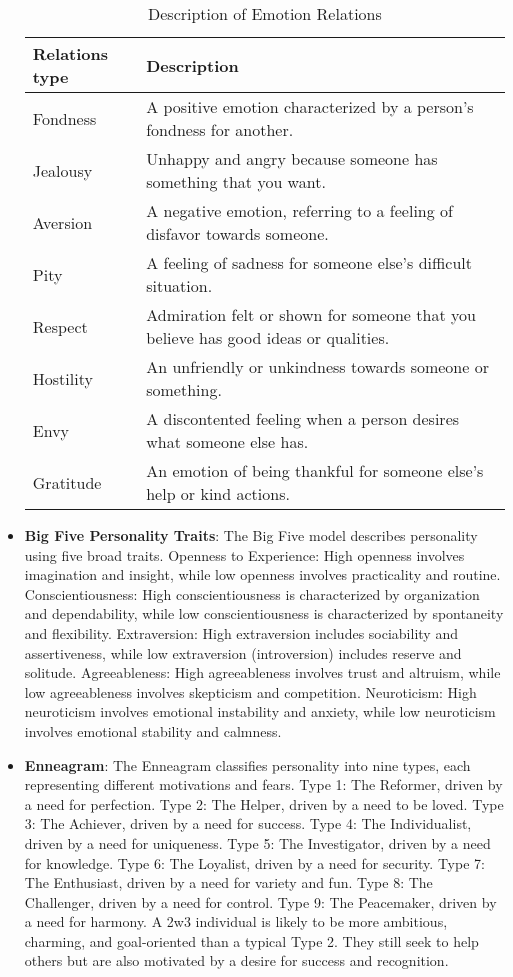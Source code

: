 \begin{itemize}
    \begin{table*}[ht]
      \small
      \centering
      \begin{tabular}{ll}
        \hline
        \textbf{Relations type} & \textbf{Description}\\
        \hline
        Fondness & A positive emotion characterized by a person's fondness for another.\\
        \hline
        Jealousy & Unhappy and angry because someone has something that you want.\\
        \hline
        Aversion  & A negative emotion, referring to a feeling of disfavor towards someone.\\
        \hline
        Pity  & A feeling of sadness for someone else's difficult situation.\\ 
        \hline
        Respect & Admiration felt or shown for someone that you believe has good ideas or qualities.\\
        \hline
        Hostility  & An unfriendly or unkindness towards someone or something.\\
        \hline
        Envy & A discontented feeling when a person desires what someone else has.\\
        \hline
        Gratitude & An emotion of being thankful for someone else's help or kind actions.\\
        \hline
      \end{tabular}
      \caption{Description of Emotion Relations}
      \label{table:emotional}  
    \end{table*}
  \item \textbf{Big Five Personality Traits}: The Big Five model describes personality using five broad traits. Openness to Experience: High openness involves imagination and insight, while low openness involves practicality and routine. Conscientiousness: High conscientiousness is characterized by organization and dependability, while low conscientiousness is characterized by spontaneity and flexibility. Extraversion: High extraversion includes sociability and assertiveness, while low extraversion (introversion) includes reserve and solitude. Agreeableness: High agreeableness involves trust and altruism, while low agreeableness involves skepticism and competition. Neuroticism: High neuroticism involves emotional instability and anxiety, while low neuroticism involves emotional stability and calmness.
  \item \textbf{Enneagram}: The Enneagram classifies personality into nine types, each representing different motivations and fears. Type 1: The Reformer, driven by a need for perfection. Type 2: The Helper, driven by a need to be loved. Type 3: The Achiever, driven by a need for success. Type 4: The Individualist, driven by a need for uniqueness. Type 5: The Investigator, driven by a need for knowledge. Type 6: The Loyalist, driven by a need for security. Type 7: The Enthusiast, driven by a need for variety and fun. Type 8: The Challenger, driven by a need for control. Type 9: The Peacemaker, driven by a need for harmony. A 2w3 individual is likely to be more ambitious, charming, and goal-oriented than a typical Type 2. They still seek to help others but are also motivated by a desire for success and recognition.

\end{itemize}
